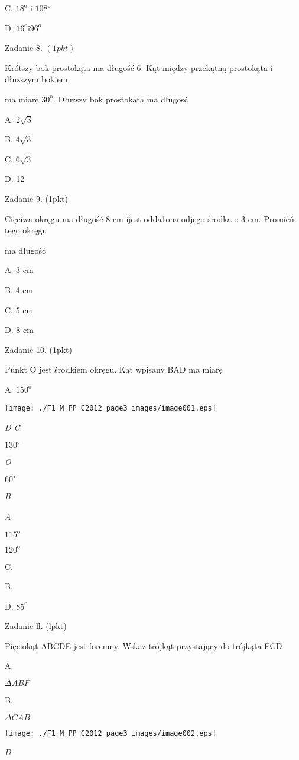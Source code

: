 \documentclass[a4paper,12pt]{article}
\begin{document}
C. $18^{\mathrm{o}}$ i $108^{\mathrm{o}}$

D. $16^{\mathrm{o}}\mathrm{i}96^{\mathrm{o}}$

Zadanie 8. $(1pkt)$

Krótszy bok prostokąta ma długość 6. Kąt między przekątną prostokąta i dłuzszym bokiem

ma miarę $30^{\mathrm{o}}$. Dłuzszy bok prostokąta ma długość

A. $2\sqrt{3}$

B. $4\sqrt{3}$

C. $6\sqrt{3}$

D. 12

Zadanie 9. (1pkt)

Cięciwa okręgu ma długość 8 cm ijest odda1ona odjego środka o 3 cm. Promień tego okręgu

ma długość

A. 3 cm

B. 4 cm

C. 5 cm

D. 8 cm

Zadanie 10. (1pkt)

Punkt O jest środkiem okręgu. Kąt wpisany BAD ma miarę

A. $150^{\mathrm{o}}$
\begin{center}
\texttt{[image: ./F1\_M\_PP\_C2012\_page3\_images/image001.eps]}
\end{center}
{\it D  C}

$130^{\circ}$

{\it O}

$60^{\circ}$

{\it B}

{\it A}

$115^{\mathrm{o}}$

$120^{\mathrm{o}}$

C.

B.

D. $85^{\mathrm{o}}$

Zadanie ll. (lpkt)

Pięciokąt ABCDE jest foremny. Wskaz trójkąt przystający do trójkąta ECD

A.

$\Delta ABF$

B.

$\Delta CAB$
\begin{center}
\texttt{[image: ./F1\_M\_PP\_C2012\_page3\_images/image002.eps]}
\end{center}
{\it D}
\end{document}
